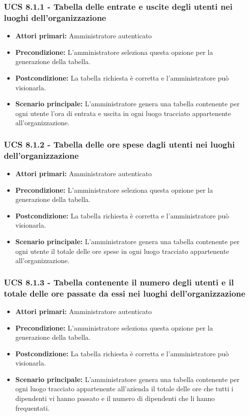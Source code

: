 \subsubsection{UCS 8.1.1 - Tabella delle entrate e uscite degli utenti nei luoghi dell'organizzazione}%
\begin{itemize}
\item \textbf{Attori primari:} Amministratore autenticato
\item \textbf{Precondizione:} L'amministratore seleziona questa opzione per la generazione della tabella.
\item \textbf{Postcondizione:} La tabella richiesta è corretta e l'amministratore può visionarla.
\item \textbf{Scenario principale:} L'amministratore genera una tabella contenente per ogni utente l'ora di entrata e uscita in ogni luogo tracciato appartenente all'organizzazione.
\end{itemize}

\subsubsection{UCS 8.1.2 - Tabella delle ore spese dagli utenti nei luoghi dell'organizzazione}%
\begin{itemize}
\item \textbf{Attori primari:} Amministratore autenticato
\item \textbf{Precondizione:} L'amministratore seleziona questa opzione per la generazione della tabella.
\item \textbf{Postcondizione:} La tabella richiesta è corretta e l'amministratore può visionarla.
\item \textbf{Scenario principale:} L'amministratore genera una tabella contenente per ogni utente il totale delle ore spese in ogni luogo tracciato appartenente all'organizzazione.
\end{itemize}

\subsubsection{UCS 8.1.3 - Tabella contenente il numero degli utenti e il totale delle ore passate da essi nei luoghi dell'organizzazione}%
\begin{itemize}
\item \textbf{Attori primari:} Amministratore autenticato
\item \textbf{Precondizione:} L'amministratore seleziona questa opzione per la generazione della tabella.
\item \textbf{Postcondizione:} La tabella richiesta è corretta e l'amministratore può visionarla.
\item \textbf{Scenario principale:} L'amministratore genera una tabella contenente per ogni luogo tracciato appartenente all'azienda il totale delle ore che tutti i dipendenti vi hanno passato e il numero di dipendenti che li hanno frequentati.
\end{itemize}

